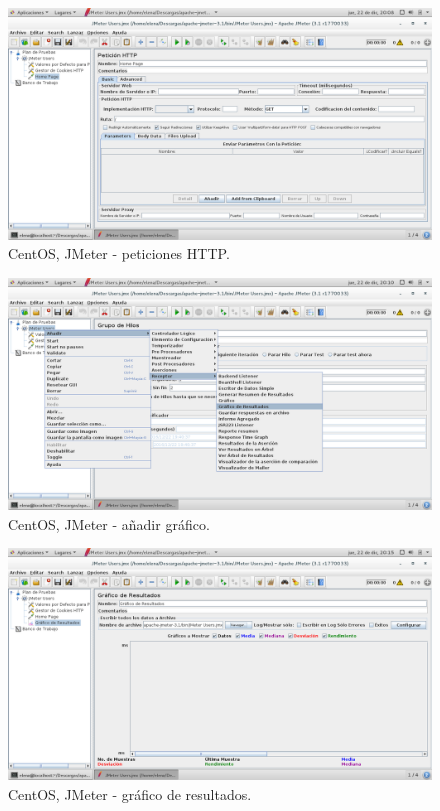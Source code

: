 \begin{figure}[H] 
	\centering
	\includegraphics[width=14.7cm]{./img/ejercicio4_8.png} 	
	\caption{CentOS, JMeter - peticiones HTTP.} \label{fig:ejercicio4_8}
\end{figure}

\begin{figure}[H] 
	\centering
	\includegraphics[width=14.7cm]{./img/ejercicio4_9.png} 	
	\caption{CentOS, JMeter - añadir gráfico.} \label{fig:ejercicio4_9}
\end{figure}

\begin{figure}[H] 
	\centering
	\includegraphics[width=14.7cm]{./img/ejercicio4_10.png} 	
	\caption{CentOS, JMeter - gráfico de resultados.} \label{fig:ejercicio4_10}
\end{figure}

